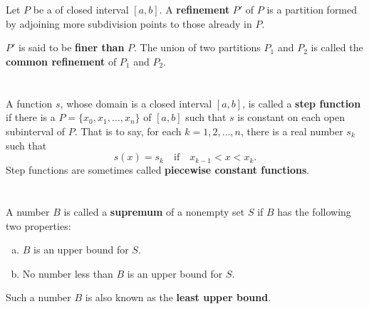 \documentclass{report}
\begin{document}
\section{}%
\label{ref:refinement}

Let $P$ be a  of closed interval $[a, b]$.
A \textbf{refinement} $P'$ of $P$ is a partition formed by adjoining more
  subdivision points to those already in $P$.

$P'$ is said to be \textbf{finer than} $P$. The union of two partitions $P_1$
  and $P_2$ is called the \textbf{common refinement} of $P_1$ and $P_2$.

\section{}%
\label{ref:step-function}

A function $s$, whose domain is a closed interval $[a, b]$, is called a
  \textbf{step function} if there is a 
  $P = \{x_0, x_1, \ldots, x_n\}$ of $[a, b]$ such that $s$ is constant on each
  open subinterval of $P$.
That is to say, for each $k = 1, 2, \ldots, n$, there is a real number $s_k$
  such that $$s(x) = s_k \quad\text{if}\quad x_{k-1} < x < x_k.$$
  Step functions are sometimes called \textbf{piecewise constant functions}.


\begin{definition}


\end{definition}

\section{}%
\label{ref:supremum}

A number $B$ is called a \textbf{supremum} of a nonempty set $S$ if $B$ has
  the following two properties:
  \begin{enumerate}[(a)]
    \item $B$ is an upper bound for $S$.
    \item No number less than $B$ is an upper bound for $S$.
  \end{enumerate}
Such a number $B$ is also known as the \textbf{least upper bound}.
\end{document}
